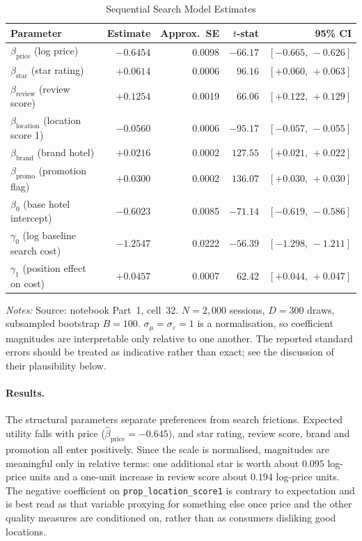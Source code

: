 \documentclass[11pt]{article}
\newcommand{\code}[1]{\texttt{\small #1}}
\begin{document}
\begin{table}[htbp]
  \centering
  \caption{Sequential Search Model Estimates}
  \label{tab:structural}
  \small
  \begin{tabular}{lrrrr}
    \toprule
    Parameter & Estimate & Approx.\ SE & $t$-stat & 95\% CI \\
    \midrule
    $\beta_{\text{price}}$ (log price)      & $-0.6454$ & 0.0098 & $-66.17$ & $[-0.665,\,-0.626]$ \\
    $\beta_{\text{star}}$ (star rating)     & $+0.0614$ & 0.0006 & $96.16$  & $[+0.060,\,+0.063]$ \\
    $\beta_{\text{review}}$ (review score)  & $+0.1254$ & 0.0019 & $66.06$  & $[+0.122,\,+0.129]$ \\
    $\beta_{\text{location}}$ (location score 1) & $-0.0560$ & 0.0006 & $-95.17$ & $[-0.057,\,-0.055]$ \\
    $\beta_{\text{brand}}$ (brand hotel)    & $+0.0216$ & 0.0002 & $127.55$ & $[+0.021,\,+0.022]$ \\
    $\beta_{\text{promo}}$ (promotion flag) & $+0.0300$ & 0.0002 & $136.07$ & $[+0.030,\,+0.030]$ \\
    $\beta_0$ (base hotel intercept)        & $-0.6023$ & 0.0085 & $-71.14$ & $[-0.619,\,-0.586]$ \\
    $\gamma_0$ (log baseline search cost)   & $-1.2547$ & 0.0222 & $-56.39$ & $[-1.298,\,-1.211]$ \\
    $\gamma_1$ (position effect on cost)    & $+0.0457$ & 0.0007 & $62.42$  & $[+0.044,\,+0.047]$ \\
    \bottomrule
  \end{tabular}
  \vspace{0.6ex}
  \begin{minipage}{0.95\textwidth}
  \footnotesize \textit{Notes:} Source: notebook Part~1, cell~32. $N = 2{,}000$
  sessions, $D = 300$ draws, subsampled bootstrap $B = 100$. $\sigma_\mu =
  \sigma_\varepsilon = 1$ is a normalisation, so coefficient magnitudes are
  interpretable only relative to one another. The reported standard errors
  should be treated as indicative rather than exact; see the discussion of
  their plausibility below.
  \end{minipage}
\end{table}

\paragraph{Results.} The structural parameters separate preferences from search
frictions. Expected utility falls with price ($\hat\beta_{\text{price}} =
-0.645$), and star rating, review score, brand and promotion all enter
positively. Since the scale is normalised, magnitudes are meaningful only in
relative terms: one additional star is worth about $0.095$ log-price units and
a one-unit increase in review score about $0.194$ log-price units. The negative
coefficient on \code{prop\_location\_score1} is contrary to expectation and is
best read as that variable proxying for something else once price and the other
quality measures are conditioned on, rather than as consumers disliking good
locations.
\end{document}
